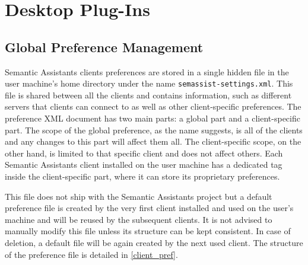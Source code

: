 %
%
   
 

\chapter{\sa Desktop Plug-Ins}\label{chap:sa-desktop}


\section{Global Preference Management}
\label{sec:pref_management}
Semantic Assistants clients preferences are stored in a single hidden file in the user machine's home directory under the name \texttt{semassist-settings.xml}. This file is shared between all the clients and contains information, such as different servers that clients can connect to as well as other client-specific preferences. The preference XML document has two main parts: a global part and a client-specific part. The scope of the global preference, as the name suggests, is all of the clients and any changes to this part will affect them all. The client-specific scope, on the other hand, is limited to that specific client and does not affect others. Each Semantic Assistants client installed on the user machine has a dedicated tag inside the client-specific part, where it can store its proprietary preferences.

This file does not ship with the Semantic Assistants project but a default preference file is created by the very first client installed and used on the user's machine and will be reused by the subsequent clients. It is not advised to manually modify this file unless its structure can be kept consistent. In case of deletion, a default file will be again created by the next used client. The structure of the preference file is detailed in \ref{client_pref}.
